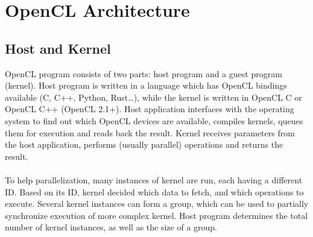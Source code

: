 
\section{OpenCL Architecture}

\subsection{Host and Kernel}

OpenCL program consists of two parts: host program and a guest program (kernel). Host program is written in a language which has OpenCL bindings available (C, C++, Python, Rust\dots), while the kernel is written in OpenCL C or OpenCL C++ (OpenCL 2.1+). Host application interfaces with the operating system to find out which OpenCL devices are available, compiles kernels, queues them for execution and reads back the result. Kernel receives parameters from the host application, performs (usually parallel) operations and returns the result.\\
\\
To help parallelization, many instances of kernel are run, each having a different ID. Based on its ID, kernel decided which data to fetch, and which operations to execute. Several kernel instances can form a group, which can be used to partially synchronize execution of more complex kernel. Host program determines the total number of kernel instances, as well as the size of a group.

